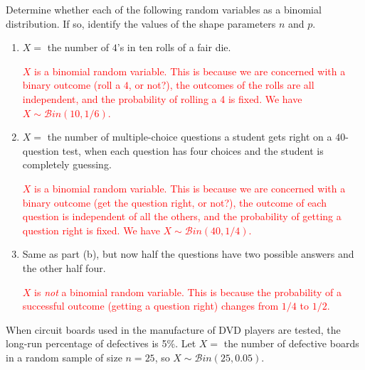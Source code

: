 \documentclass[12pt,reqno]{amsart}
\begin{document}
\bigskip

\prob Determine whether each of the following random variables as a binomial distribution. If so, identify the values of the shape parameters $n$ and $p$.

\medskip
\begin{enumerate}
\item $X=$ the number of $4$'s in ten rolls of a fair die.

\bigskip
\textcolor{red}{$X$ is a binomial random variable. This is because we are concerned with a binary outcome (roll a $4$, or not?), the outcomes of the rolls are all independent, and the probability of rolling a 4 is fixed. We have $X\sim \mathcal{B}in(10,1/6)$.}
\bigskip

\item $X=$ the number of multiple-choice questions a student gets right on a $40$-question test, when each question has four choices and the student is completely guessing.

\bigskip
\textcolor{red}{$X$ is a binomial random variable. This is because we are concerned with a binary outcome (get the question right, or not?), the outcome of each question is independent of all the others, and the probability of getting a question right is fixed. We have $X\sim \mathcal{B}in(40, 1/4)$.}
\bigskip

\item Same as part (b), but now half the questions have two possible answers and the other half four.

\bigskip
\textcolor{red}{$X$ is \textit{not} a binomial random variable. This is because the probability of a successful outcome (getting a question right) changes from $1/4$ to $1/2$.}
\end{enumerate}











\bigskip
\prob When circuit boards used in the manufacture of DVD players are tested, the long-run percentage of defectives is 5\%. Let $X =$ the number of defective boards in a random sample of size $n = 25$, so $X \sim \mathcal{B}in(25, 0.05)$.
\end{document}
